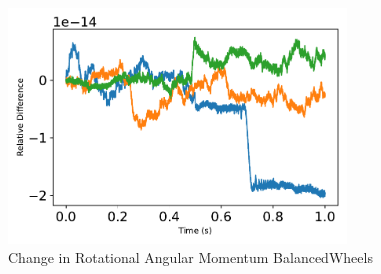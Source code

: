 \begin{figure}[htbp]\centerline{\includegraphics[width=0.8\textwidth]{AutoTeX/ChangeInRotationalAngularMomentumBalancedWheels}}\caption{Change in Rotational Angular Momentum BalancedWheels}\label{fig:ChangeInRotationalAngularMomentumBalancedWheels}\end{figure}